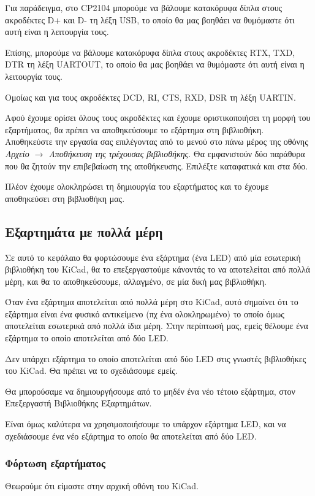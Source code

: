 \documentclass[a4paper]{article}
\begin{document}
Για παράδειγμα, στο CP2104 μπορούμε να βάλουμε κατακόρυφα δίπλα στους ακροδέκτες D+ και D- τη λέξη USB, το οποίο θα μας βοηθάει να θυμόμαστε ότι αυτή είναι η λειτουργία τους.

Επίσης, μπορούμε να βάλουμε κατακόρυφα δίπλα στους ακροδέκτες RTX, TXD, DTR τη λέξη UARTOUT, το οποίο θα μας βοηθάει να θυμόμαστε ότι αυτή είναι η λειτουργία τους.

Ομοίως και για τους ακροδέκτες DCD, RI, CTS, RXD, DSR τη λέξη UARTΙΝ.

Αφού έχουμε ορίσει όλους τους ακροδέκτες και έχουμε οριστικοποιήσει τη μορφή του εξαρτήματος, θα πρέπει να αποθηκεύσουμε το εξάρτημα στη βιβλιοθήκη. Αποθηκεύστε την εργασία σας επιλέγοντας από το μενού στο πάνω μέρος της οθόνης \textit{Αρχείο $\rightarrow$ Αποθήκευση της τρέχουσας βιβλιοθήκης}. Θα εμφανιστούν δύο παράθυρα που θα ζητούν την επιβεβαίωση της αποθήκευσης. Επιλέξτε καταφατικά και στα δύο.

Πλέον έχουμε ολοκληρώσει τη δημιουργία του εξαρτήματος και το έχουμε αποθηκεύσει στη βιβλιοθήκη μας.


\subsection{Εξαρτημάτα με πολλά μέρη}

Σε αυτό το κεφάλαιο θα φορτώσουμε ένα εξάρτημα (ένα LED) από μία εσωτερική βιβλιοθήκη του \textenglish{KiCad}, θα το επεξεργαστούμε κάνοντάς το να αποτελείται από πολλά μέρη, και θα το αποθηκεύσουμε, αλλαγμένο, σε μία δική μας βιβλιοθήκη.

Όταν ένα εξάρτημα αποτελείται από πολλά μέρη στο \textenglish{KiCad}, αυτό σημαίνει ότι το εξάρτημα είναι ένα φυσικό αντικείμενο (πχ ένα ολοκληρωμένο) το οποίο όμως αποτελείται εσωτερικά από πολλά ίδια μέρη. Στην περίπτωσή μας, εμείς θέλουμε ένα εξάρτημα το οποίο αποτελείται από δύο LED.

Δεν υπάρχει εξάρτημα το οποίο αποτελείται από δύο LED στις γνωστές βιβλιοθήκες του \textenglish{KiCad}. Θα πρέπει να το σχεδιάσουμε εμείς.

Θα μπορούσαμε να δημιουργήσουμε από το μηδέν ένα νέο τέτοιο εξάρτημα, στον Επεξεργαστή Βιβλιοθήκης Εξαρτημάτων. 

Είναι όμως καλύτερα να χρησιμοποιήσουμε το υπάρχον εξάρτημα LED, και να σχεδιάσουμε ένα νέο εξάρτημα το οποίο θα αποτελείται από δύο LED.

\subsubsection{Φόρτωση εξαρτήματος}
Θεωρούμε ότι είμαστε στην αρχική οθόνη του \textenglish{KiCad}. 
\end{document}
